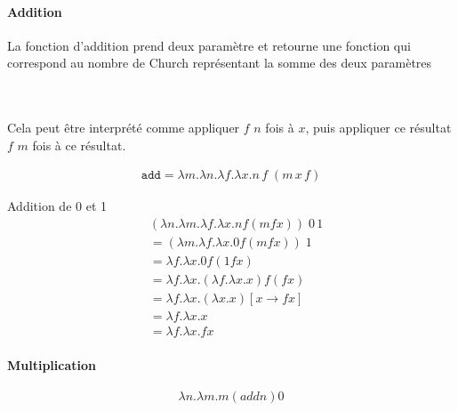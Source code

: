 \documentclass{report}
\begin{document}
\begin{multicols*}{3}
  \paragraph{Addition}
  La fonction d'addition prend deux paramètre et retourne 
  une fonction qui correspond au nombre de Church représentant la 
  somme des deux paramètres 

  \mbox{}\\\\
  \noindent 
  Cela peut être interprété comme appliquer $f$ $n$ fois à $x$, puis 
  appliquer ce résultat $f$ $m$ fois à ce résultat.

  \begin{align*}
    \texttt{add} = \lambda m . \lambda n . \lambda f . \lambda x . n \, f \; 
    (m \, x \, f)
  \end{align*}

  \begin{EExample}{Addition de 0 et 1}{}
   \begin{align*}
    &(\lambda n . \lambda m . \lambda f . \lambda x . n f (m f x)) \; 0 \, 1 \\
    &= (\lambda m . \lambda f . \lambda x . 0 f (m f x)) \; 1 \\
    &= \lambda f . \lambda x . 0 f (1 f x) \\
    &= \lambda f . \lambda x . (\lambda f . \lambda x . x) f (f x) \\
    &= \lambda f . \lambda x . (\lambda x . x)[x \rightarrow f x] \\
    &= \lambda f . \lambda x . x \\
    &= \lambda f . \lambda x . f x
    \end{align*}     
  \end{EExample}


  \paragraph{Multiplication}
$$\lambda n . \lambda m . m (add n ) 0 $$





\end{multicols*}
\end{document}
